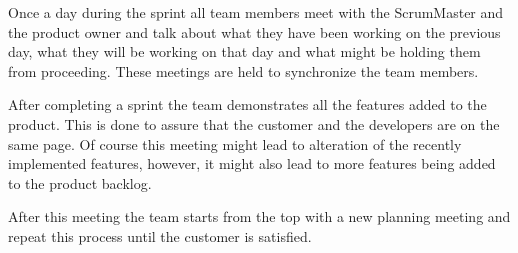 Once a day during the sprint all team members meet with the ScrumMaster and the product owner and talk about what they have been working on the previous day, what they will be working on that day and what might be holding them from proceeding. These meetings are held to synchronize the team members.

After completing a sprint the team demonstrates all the features added to the product. This is done to assure that the customer and the developers are on the same page. Of course this meeting might lead to alteration of the recently implemented features, however, it might also lead to more features being added to the product backlog.

After this meeting the team starts from the top with a new planning meeting and repeat this process until the customer is satisfied.

